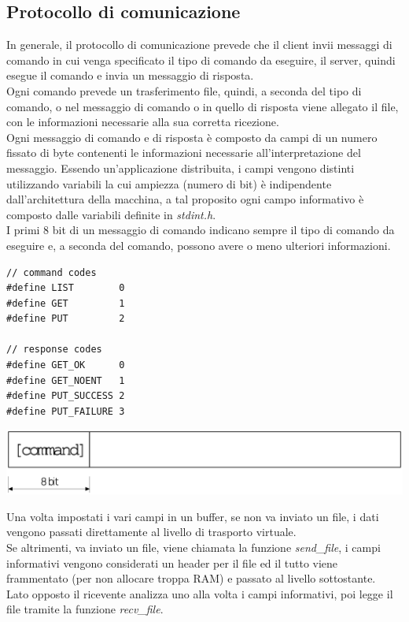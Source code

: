 \subsection{Protocollo di comunicazione}
In generale, il protocollo di comunicazione prevede che il client invii messaggi di comando in cui venga specificato il tipo di comando da eseguire, il server, quindi esegue il comando e invia un messaggio di risposta.\\
Ogni comando prevede un trasferimento file, quindi, a seconda del tipo di comando, o nel messaggio di comando o in quello di risposta viene allegato il file, con le informazioni necessarie alla sua corretta ricezione.\\
Ogni messaggio di comando e di risposta è composto da campi di un numero fissato di byte contenenti le informazioni necessarie all'interpretazione del messaggio.
Essendo un'applicazione distribuita, i campi vengono distinti utilizzando variabili la cui ampiezza (numero di bit) è indipendente dall'architettura della macchina, a tal proposito ogni campo informativo è composto dalle variabili definite in \emph{stdint.h}.\\ 
I primi 8 bit di un messaggio di comando indicano sempre il tipo di comando da eseguire e, a seconda del comando, possono avere o meno ulteriori informazioni.

\begin{lstlisting}[title=Costanti comandi]
// command codes
#define LIST 		0
#define GET 		1
#define PUT 		2

// response codes
#define GET_OK      0
#define GET_NOENT   1
#define PUT_SUCCESS 2
#define PUT_FAILURE 3
\end{lstlisting}

\includegraphics[scale=0.35]{images/gen_message}

Una volta impostati i vari campi in un buffer, se non va inviato un file, i dati vengono passati direttamente al livello di trasporto virtuale.\\
Se altrimenti, va inviato un file, viene chiamata la funzione \emph{send\_file}, i campi informativi vengono considerati un header per il file ed il tutto viene frammentato (per non allocare troppa RAM) e passato al livello sottostante.\\
Lato opposto il ricevente analizza uno alla volta i campi informativi, poi legge il file tramite la funzione \emph{recv\_file}.


